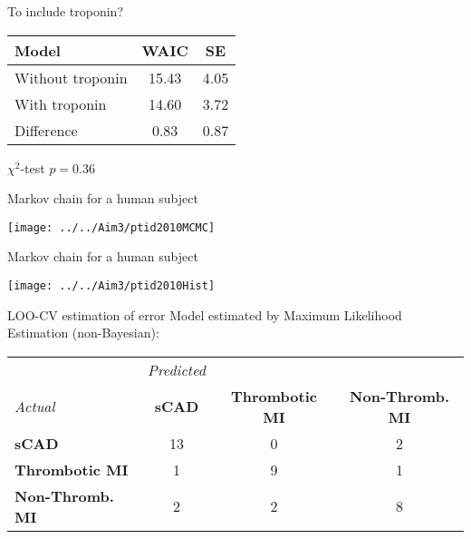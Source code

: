 \documentclass[xcolor=dvipsnames]{beamer}
\begin{document}
\begin{frame}{To include troponin?}
	\vspace{-10.5pt}
	\begin{center}
		\begin{tabular}{lcc}
			\hline
			Model & WAIC  & SE \\
			\hline
			Without troponin & 15.43 & 4.05 \\ 
			With troponin & 14.60 & 3.72 \\
			Difference & 0.83 & 0.87 \\
			\hline
		\end{tabular}
		
		$\chi^2$-test $p=0.36$
	\end{center}
\end{frame}

\begin{frame}{Markov chain for a human subject}
	\vspace{-5pt}
	\begin{center}
		\texttt{[image: ../../Aim3/ptid2010MCMC]}
	\end{center}
\end{frame}

\begin{frame}{Markov chain for a human subject}
	\vspace{-7pt}
	\begin{center}
		\texttt{[image: ../../Aim3/ptid2010Hist]}
	\end{center}
\end{frame}

\begin{frame}{LOO-CV estimation of error}
	\vspace{-15pt}
	Model estimated by Maximum Likelihood Estimation (non-Bayesian):
	\vspace{4ex}
	
	\begin{tabular}{l|ccc}
		& \emph{Predicted} & & \\
		\emph{Actual}  & \textbf{sCAD} & \textbf{Thrombotic MI} & \textbf{Non-Thromb. MI} \\
		\hline
		\textbf{sCAD} & 13 &  0 & 2\\
		\textbf{Thrombotic MI} &   1 & 9 &  1\\
		\textbf{Non-Thromb. MI}  & 2  & 2 & 8 
	\end{tabular}
\end{frame}
\end{document}
